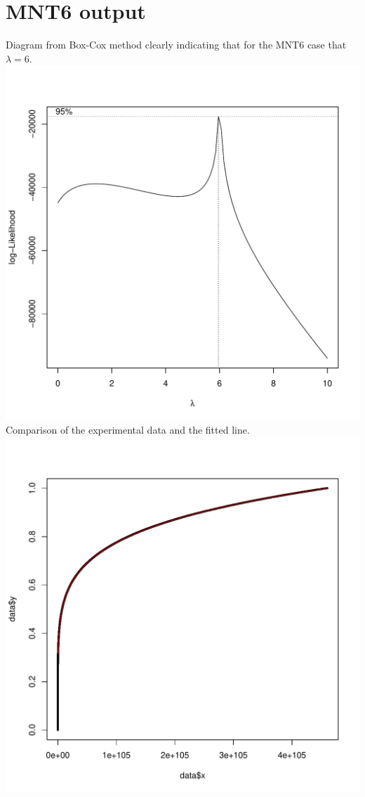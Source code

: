 \documentclass[a4paper, 12pt, envcountsect, runningheads]{llncs}
\numberwithin{figure}{section}
\numberwithin{equation}{section}
\begin{document}


\newpage
\appendix
\section{MNT6 output}\label{A:MNT6_output}
Diagram from Box-Cox method clearly indicating that for the MNT6 case that $\lambda=6$.\\
\includegraphics[scale=0.45]{graphs/CheckLineFit2}\label{fig:boxcox}\\
Comparison of the experimental data and the fitted line.\\
\includegraphics[scale=0.45]{graphs/CheckLineFit4}\label{fig:linefit}
\end{document}
